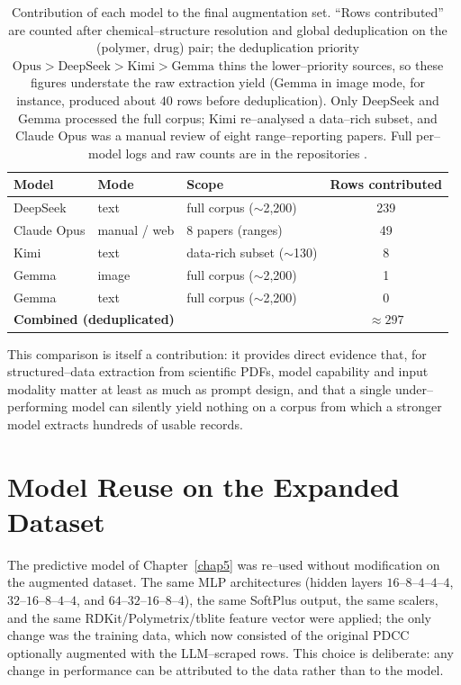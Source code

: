 \begin{table}[htbp]
	\centering
	\caption{Contribution of each model to the final augmentation set. ``Rows contributed'' are counted after chemical--structure resolution and global deduplication on the (polymer, drug) pair; the deduplication priority $\text{Opus} > \text{DeepSeek} > \text{Kimi} > \text{Gemma}$ thins the lower--priority sources, so these figures understate the raw extraction yield (Gemma in image mode, for instance, produced about $40$ rows before deduplication). Only DeepSeek and Gemma processed the full corpus; Kimi re--analysed a data--rich subset, and Claude Opus was a manual review of eight range--reporting papers. Full per--model logs and raw counts are in the repositories \cite{repo, repo_scraper}.}
	\label{tab:cont_llm_comparison}
	\begin{tabular}{lllc}
		\toprule
		\textbf{Model} & \textbf{Mode} & \textbf{Scope} & \textbf{Rows contributed} \\
		\midrule
		DeepSeek    & text         & full corpus ($\sim$2{,}200)  & 239 \\
		Claude Opus & manual / web & 8 papers (ranges)            & 49  \\
		Kimi        & text         & data-rich subset ($\sim$130) & 8   \\
		Gemma       & image        & full corpus ($\sim$2{,}200)  & 1   \\
		Gemma       & text         & full corpus ($\sim$2{,}200)  & 0   \\
		\midrule
		\multicolumn{3}{l}{\textbf{Combined (deduplicated)}} & $\approx 297$ \\
		\bottomrule
	\end{tabular}
\end{table}

This comparison is itself a contribution: it provides direct evidence that, for structured--data extraction from scientific PDFs, model capability and input modality matter at least as much as prompt design, and that a single under--performing model can silently yield nothing on a corpus from which a stronger model extracts hundreds of usable records.

\section{Model Reuse on the Expanded Dataset}
\label{sec:cont_reuse}

The predictive model of Chapter~\ref{chap5} was re--used without modification on the augmented dataset. The same MLP architectures (hidden layers $16$--$8$--$4$--$4$--$4$, $32$--$16$--$8$--$4$--$4$, and $64$--$32$--$16$--$8$--$4$), the same SoftPlus output, the same scalers, and the same RDKit/Polymetrix/tblite feature vector were applied; the only change was the training data, which now consisted of the original PDCC optionally augmented with the LLM--scraped rows. This choice is deliberate: any change in performance can be attributed to the data rather than to the model.

